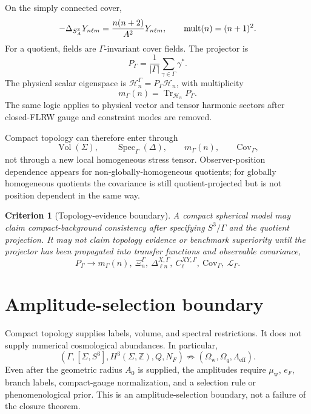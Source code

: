 \documentclass[
  aps,
  prd,
  reprint,
  superscriptaddress,
  floatfix,
  nofootinbib,
  longbibliography
]{revtex4-2}
\theoremstyle{plain}
\newtheorem{criterion}[theorem]{Criterion}
\theoremstyle{definition}
\theoremstyle{remark}
\newcommand{\wind}{\mathrm w}
\newcommand{\eff}{\mathrm{eff}}
\newcommand{\Ow}{\Omega_{\mathrm w}}
\newcommand{\Oq}{\Omega_q}
\DeclareMathOperator{\Vol}{Vol}
\DeclareMathOperator{\Spec}{Spec}
\DeclareMathOperator{\Tr}{Tr}
\newcommand{\Z}{\mathbb Z}
\newcommand{\NF}{N_F}
\newcommand{\eF}{e_F}
\newcommand{\PG}{P_\Gamma}
\newcommand{\Hn}{\mathcal H_n}
\begin{document}
On the simply connected cover,
\begin{equation}
-\Delta_{S_A^3}Y_{n\ell m}=\frac{n(n+2)}{A^2}Y_{n\ell m},
\qquad
{\rm mult}(n)=(n+1)^2 .
\label{eq:s3_spectrum_v5}
\end{equation}
For a quotient, fields are \(\Gamma\)-invariant cover fields.  The projector is
\begin{equation}
\boxed{
\PG=\frac1{|\Gamma|}\sum_{\gamma\in\Gamma}\gamma^* .
}
\label{eq:quotient_projector_v5}
\end{equation}
The physical scalar eigenspace is \(\Hn^\Gamma=\PG\Hn\), with multiplicity
\begin{equation}
m_\Gamma(n)=\Tr_{\Hn}\PG .
\label{eq:quotient_multiplicity_v5}
\end{equation}
The same logic applies to physical vector and tensor harmonic sectors after
closed-FLRW gauge and constraint modes are removed.

Compact topology can therefore enter through
\begin{equation}
\Vol(\Sigma),\qquad \Spec_\Gamma(\Delta),\qquad m_\Gamma(n),\qquad
\mathrm{Cov}_\Gamma,
\label{eq:topology_channels_v5}
\end{equation}
not through a new local homogeneous stress tensor.  Observer-position dependence
appears for non-globally-homogeneous quotients; for globally homogeneous
quotients the covariance is still quotient-projected but is not position
dependent in the same way.

\begin{criterion}[Topology-evidence boundary]
A compact spherical model may claim compact-background consistency after
specifying \(S^3/\Gamma\) and the quotient projection.  It may not claim topology
evidence or benchmark superiority until the projector has been propagated into
transfer functions and observable covariance,
\begin{equation}
\PG\longrightarrow
m_\Gamma(n),\ \Xi_n^\Gamma,\
\Delta_{\ell n}^{X,\Gamma},\ C_\ell^{XY,\Gamma},\
\mathrm{Cov}_\Gamma,\ \mathcal L_\Gamma .
\label{eq:transfer_boundary_v5}
\end{equation}
\end{criterion}

\section{Amplitude-selection boundary}

Compact topology supplies labels, volume, and spectral restrictions.  It does
not supply numerical cosmological abundances.  In particular,
\begin{equation}
(\Gamma,[\Sigma,S^3],H^3(\Sigma,\Z),Q,\NF)
\not\Rightarrow
(\Ow,\Oq,\Lambda_{\eff}) .
\label{eq:not_amplitudes_v5}
\end{equation}
Even after the geometric radius \(A_0\) is supplied, the amplitudes require
\(\mu_{\wind}\), \(\eF\), branch labels, compact-gauge normalization, and a
selection rule or phenomenological prior.  This is an amplitude-selection
boundary, not a failure of the closure theorem.
\end{document}
